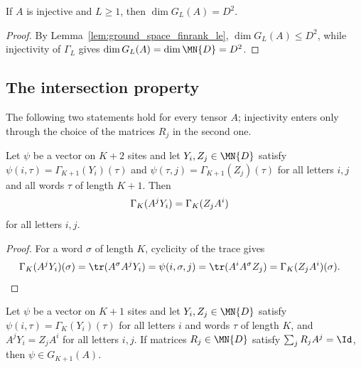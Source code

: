 \begin{lemma}\label{thm:ground_space_finrank_eq}
    \leanok
    If $A$ is injective and $L \ge 1$, then $\dim G_L(A) = D^2$.
\end{lemma}

\begin{proof}
    \leanok
    By Lemma~\ref{lem:ground_space_finrank_le}, $\dim G_L(A) \le D^2$, while
    injectivity of $\Gamma_L$ gives $\dim G_L(A) = \dim \MN{D} = D^2$.
\end{proof}

\subsection{The intersection property}

The following two statements hold for every tensor $A$; injectivity enters
only through the choice of the matrices $R_j$ in the second one.

\begin{lemma}%
    \label{thm:ground_space_restriction_overlap}
    \leanok
    Let $\psi$ be a vector on $K+2$ sites and let $Y_i,Z_j\in\MN{D}$ satisfy
    $\psi(i,\tau)=\Gamma_{K+1}(Y_i)(\tau)$ and
    $\psi(\tau,j)=\Gamma_{K+1}(Z_j)(\tau)$ for all letters $i,j$ and all words
    $\tau$ of length $K+1$. Then
    \begin{align}
        \Gamma_{K}(A^jY_i) & =\Gamma_{K}(Z_jA^i)
        \notag
    \end{align}
    for all letters $i,j$.
\end{lemma}

\begin{proof}
    \leanok
    For a word $\sigma$ of length $K$, cyclicity of the trace gives
    \begin{align}
        \Gamma_{K}(A^jY_i)(\sigma)
         & =\tr(A^\sigma A^jY_i)
        =\psi(i,\sigma,j)
        =\tr(A^iA^\sigma Z_j)
        =\Gamma_{K}(Z_jA^i)(\sigma).
        \notag
    \end{align}
\end{proof}

\begin{lemma}%
    \label{thm:ground_space_grow_back}
    \leanok
    Let $\psi$ be a vector on $K+1$ sites and let $Y_i,Z_j\in\MN{D}$ satisfy
    $\psi(i,\tau)=\Gamma_{K}(Y_i)(\tau)$ for all letters $i$ and words $\tau$
    of length $K$, and $A^jY_i=Z_jA^i$ for all letters $i,j$. If matrices
    $R_j\in\MN{D}$ satisfy $\sum_jR_jA^j=\Id$, then $\psi\in G_{K+1}(A)$.
\end{lemma}

